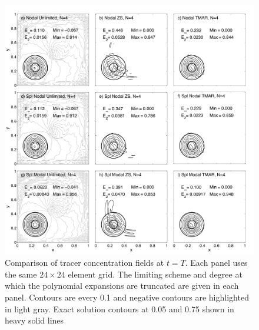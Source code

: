 \documentclass{ametsoc}
\begin{document}
\begin{figure} 
\includegraphics[width=\textwidth]{figs/2d/_defCosbell_9pan_24e.pdf}
\caption{Comparison of tracer concentration fields at $t=T$. Each panel uses the same $24\times24$ element grid. The limiting scheme and degree at which the polynomial expansions are truncated are given in each panel. Contours are every 0.1 and negative contours are highlighted in light gray. Exact solution contours at 0.05 and 0.75 shown in heavy solid lines}\label{fig:2dCosbell24}
\end{figure}
\end{document}
